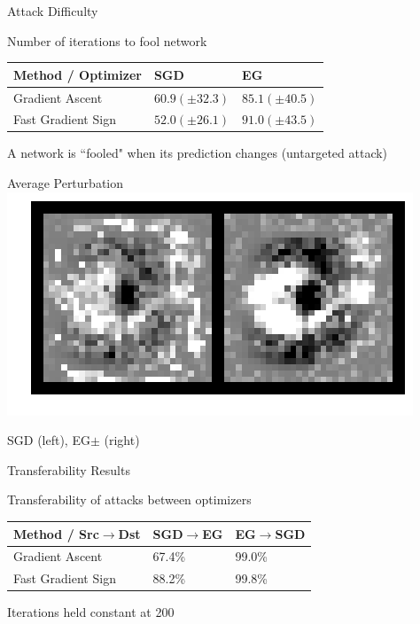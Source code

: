 \documentclass{beamer}
\begin{document}
	\begin{frame}{Attack Difficulty}
		\begin{block}{Number of iterations to fool network}
			\begin{center}
				\begin{tabular}{| l | l | l |}
					\hline
					Method / Optimizer & SGD & EG \\ \hline
					Gradient Ascent & $60.9 (\pm 32.3)$ & $85.1 (\pm 40.5)$ \\ \hline
					Fast Gradient Sign & $52.0 (\pm 26.1)$ & $91.0 (\pm 43.5)$ \\ \hline
				\end{tabular}
			\end{center}
		\end{block}
		A network is ``fooled" when its prediction changes (untargeted attack)
	\end{frame}
	
	\begin{frame}{Average Perturbation}
		\centering
		\includegraphics[width=\textwidth]{avg_attack_3}
		
		SGD (left), EG$\pm$ (right)
	\end{frame}
	
	\begin{frame}{Transferability Results}
		\begin{block}{Transferability of attacks between optimizers}
			\begin{center}
				\begin{tabular}{| l | l | l |}
					\hline
					Method / Src$\rightarrow$Dst & SGD$\rightarrow$EG & EG$\rightarrow$SGD  \\ \hline
					Gradient Ascent & 67.4\% & 99.0\% \\ \hline
					Fast Gradient Sign & 88.2\% & 99.8\% \\ \hline
				\end{tabular}
			\end{center}
		\end{block}
		Iterations held constant at 200
	\end{frame}
	
\end{document}
